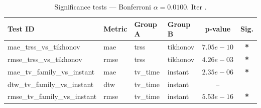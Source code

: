 ﻿%
\begin{table}[ht]
\centering
\caption[EEG reconstruction - Iteration it18]{Significance tests — Bonferroni $\alpha=0.0100$. Iter .}
\label{tab:sig_it18_directed_tv_vs_trss}
\small
\begin{tabular}{llllcc}
\toprule
Test ID & Metric & Group A & Group B & p-value & Sig. \\
\midrule
mae\_trss\_vs\_tikhonov & mae & trss & tikhonov & $7.05e-10$ & \textbf{*} \\
rmse\_trss\_vs\_tikhonov & rmse & trss & tikhonov & $4.26e-03$ & \textbf{*} \\
mae\_tv\_family\_vs\_instant & mae & tv\_time & instant & $2.35e-06$ & \textbf{*} \\
dtw\_tv\_family\_vs\_instant & dtw & tv\_time & instant & -- &  \\
rmse\_tv\_family\_vs\_instant & rmse & tv\_time & instant & $5.53e-16$ & \textbf{*} \\
\bottomrule
\end{tabular}
\end{table}








